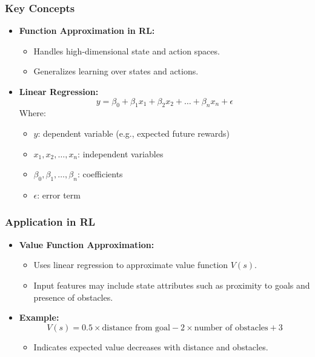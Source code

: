 \documentclass[aspectratio=169]{beamer}
\begin{document}
\begin{frame}[fragile]
    \frametitle{Key Concepts}
    \begin{itemize}
        \item \textbf{Function Approximation in RL:} 
            \begin{itemize}
                \item Handles high-dimensional state and action spaces.
                \item Generalizes learning over states and actions.
            \end{itemize}
        
        \item \textbf{Linear Regression:} 
            \begin{equation}
            y = \beta_0 + \beta_1 x_1 + \beta_2 x_2 + \ldots + \beta_n x_n + \epsilon
            \end{equation}
            Where:
            \begin{itemize}
                \item \( y \): dependent variable (e.g., expected future rewards)
                \item \( x_1, x_2, \ldots, x_n \): independent variables
                \item \( \beta_0, \beta_1, \ldots, \beta_n \): coefficients
                \item \( \epsilon \): error term
            \end{itemize}
    \end{itemize}
\end{frame}

\begin{frame}[fragile]
    \frametitle{Application in RL}
    \begin{itemize}
        \item \textbf{Value Function Approximation:}
            \begin{itemize}
                \item Uses linear regression to approximate value function \( V(s) \).
                \item Input features may include state attributes such as proximity to goals and presence of obstacles.
            \end{itemize}

        \item \textbf{Example:}
            \begin{equation}
            V(s) = 0.5 \times \text{distance from goal} - 2 \times \text{number of obstacles} + 3
            \end{equation}
            \begin{itemize}
                \item Indicates expected value decreases with distance and obstacles.
            \end{itemize}
    \end{itemize}
\end{frame}
\end{document}
